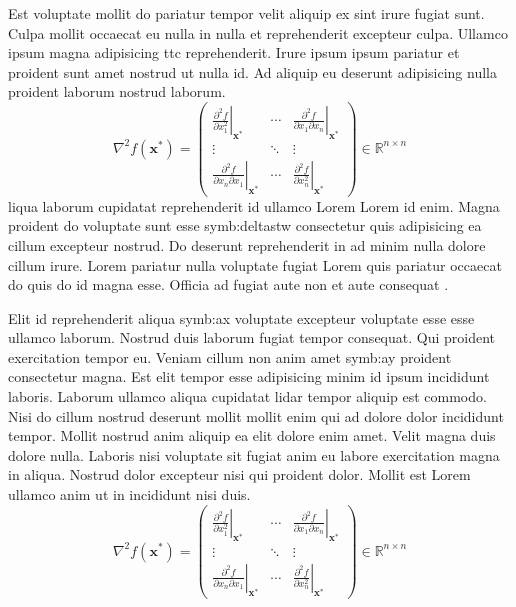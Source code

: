 Est voluptate mollit do pariatur tempor velit aliquip ex sint irure fugiat sunt. 
Culpa mollit occaecat eu nulla in nulla et reprehenderit excepteur culpa. 
Ullamco ipsum magna adipisicing \gls{ttc} reprehenderit.
Irure ipsum ipsum pariatur et proident sunt amet nostrud ut nulla id. 
Ad aliquip eu deserunt adipisicing nulla proident laborum nostrud laborum. 
\begin{equation}
    \nabla^2 f(\bm{x}^*) = 
    \begin{pmatrix}
        \left.\frac{\partial^2 f}{\partial x_1^2}\right\rvert_{\bm{x}^*} & \cdots &  \left.\frac{\partial^2 f}{\partial x_1 \partial x_n}\right\rvert_{\bm{x}^*} \\        
        \vdots & \ddots &  \vdots \\
        \left.\frac{\partial^2 f}{\partial x_n \partial x_1}\right\rvert_{\bm{x}^*} & \cdots &  \left.\frac{\partial^2 f}{\partial x_n^2}\right\rvert_{\bm{x}^*} 
    \end{pmatrix}
    \in  \mathbb{R}^{n \times n}
\end{equation}
liqua laborum cupidatat reprehenderit id ullamco Lorem Lorem id enim. 
Magna proident do voluptate sunt esse \gls{symb:deltastw} consectetur quis adipisicing ea cillum excepteur nostrud. 
Do deserunt reprehenderit in ad minim nulla dolore cillum irure. 
Lorem pariatur nulla voluptate fugiat Lorem quis pariatur occaecat do quis do id magna esse. 
Officia ad fugiat aute non et aute consequat \cite{Att.2017}.

Elit id reprehenderit aliqua \gls{symb:ax} voluptate excepteur voluptate esse esse ullamco laborum. 
Nostrud duis laborum fugiat tempor consequat. Qui proident exercitation tempor eu. 
Veniam cillum non anim amet \gls{symb:ay} proident consectetur magna. 
Est elit tempor esse adipisicing minim id ipsum incididunt laboris.
Laborum ullamco aliqua cupidatat \gls{lidar} tempor aliquip est commodo. 
Nisi do cillum nostrud deserunt mollit mollit enim qui ad dolore dolor incididunt tempor. 
Mollit nostrud anim aliquip ea elit dolore enim amet. Velit magna duis dolore nulla. 
Laboris nisi voluptate sit fugiat anim eu labore exercitation magna in aliqua. 
Nostrud dolor excepteur nisi qui proident dolor. Mollit est Lorem ullamco anim ut in incididunt nisi duis.
\begin{equation}
    \nabla^2 f(\bm{x}^*) = 
    \begin{pmatrix}
        \left.\frac{\partial^2 f}{\partial x_1^2}\right\rvert_{\bm{x}^*} & \cdots &  \left.\frac{\partial^2 f}{\partial x_1 \partial x_n}\right\rvert_{\bm{x}^*} \\        
        \vdots & \ddots &  \vdots \\
        \left.\frac{\partial^2 f}{\partial x_n \partial x_1}\right\rvert_{\bm{x}^*} & \cdots &  \left.\frac{\partial^2 f}{\partial x_n^2}\right\rvert_{\bm{x}^*} 
    \end{pmatrix}
    \in  \mathbb{R}^{n \times n}
\end{equation}

